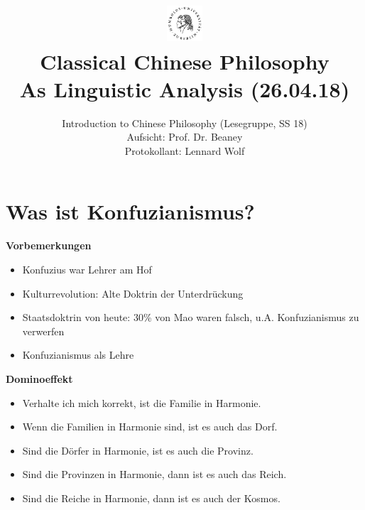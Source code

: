 \documentclass[a4paper, emulatestandardclasses]{scrartcl}
\date{\vspace{-3ex}}
\begin{document}
\title{
    \vspace{-30pt}
	\includegraphics*[width=0.1\textwidth,right]{ErstesSem/images/hu_logo2.png}\\
	\vspace{-10pt}
	Classical Chinese Philosophy\\As Linguistic Analysis (26.04.18)}%
	\subtitle{Introduction to Chinese Philosophy (Lesegruppe, SS 18)\\
          Aufsicht: Prof. Dr. Beaney\\
          Protokollant: Lennard Wolf}
\maketitle
\vspace{-40pt}

\section*{Was ist Konfuzianismus?}
\textbf{Vorbemerkungen}

\begin{itemize}
  \item Konfuzius war Lehrer am Hof
  \item Kulturrevolution: Alte Doktrin der Unterdrückung
  \item Staatsdoktrin von heute: 30\% von Mao waren falsch, u.A. Konfuzianismus zu verwerfen 
  \item Konfuzianismus als Lehre
\end{itemize}

\noindent \textbf{Dominoeffekt}

\begin{itemize}
  \item Verhalte ich mich korrekt, ist die Familie in Harmonie.
  \item Wenn die Familien in Harmonie sind, ist es auch das Dorf.
  \item Sind die Dörfer in Harmonie, ist es auch die Provinz.
  \item Sind die Provinzen in Harmonie, dann ist es auch das Reich.
  \item Sind die Reiche in Harmonie, dann ist es auch der Kosmos.
\end{itemize}
\end{document}

